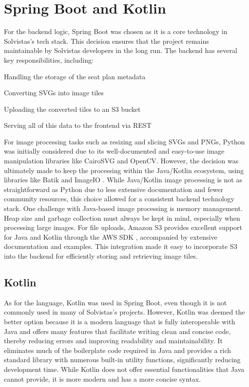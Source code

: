 \section{Spring Boot and Kotlin}
For the backend logic, Spring Boot was chosen as it is a core technology in Solvistas's tech stack. This decision ensures that the project remains maintainable by Solvistas developers in the long run. The backend has several key responsibilities, including:
\begin{compactitem}
    \item Handling the storage of the seat plan metadata
    \item Converting SVGs into image tiles
    \item Uploading the converted tiles to an S3 bucket
    \item Serving all of this data to the frontend via REST
\end{compactitem}

For image processing tasks such as resizing and slicing SVGs and PNGs, Python was initially considered due to its well-documented and easy-to-use image manipulation libraries like CairoSVG and OpenCV. However, the decision was ultimately made to keep the processing within the Java/Kotlin ecosystem, using libraries like Batik \cite{BatikDocs} and ImageIO \cite{JavaImageIODocs}. While Java/Kotlin image processing is not as straightforward as Python due to less extensive documentation and fewer community resources, this choice allowed for a consistent backend technology stack. One challenge with Java-based image processing is memory management. Heap size and garbage collection must always be kept in mind, especially when processing large images. For file uploads, Amazon S3 provides excellent support for Java and Kotlin through the AWS SDK \cite{AWSKotlinSDK}, accompanied by extensive documentation and examples. This integration made it easy to incorporate S3 into the backend for efficiently storing and retrieving image tiles.

\subsection{Kotlin}
As for the language, Kotlin was used in Spring Boot, even though it is not commonly used in many of Solvistas's projects. However, Kotlin was deemed the better option because it is a modern language that is fully interoperable with Java and offers many features that facilitate writing clean and concise code, thereby reducing errors and improving readability and maintainability. It eliminates much of the boilerplate code required in Java and provides a rich standard library with numerous built-in utility functions, significantly reducing development time. While Kotlin does not offer essential functionalities that Java cannot provide, it is more modern and has a more concise syntax.


